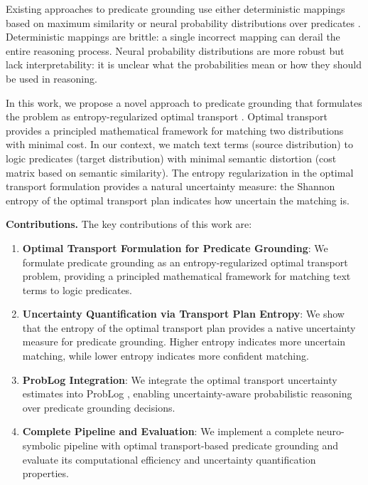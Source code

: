\documentclass[11pt,letterpaper]{article}
\begin{document}
Existing approaches to predicate grounding use either deterministic mappings based on maximum similarity \cite{Ryu2024} or neural probability distributions over predicates \cite{Yang2020}. Deterministic mappings are brittle: a single incorrect mapping can derail the entire reasoning process. Neural probability distributions are more robust but lack interpretability: it is unclear what the probabilities mean or how they should be used in reasoning.

In this work, we propose a novel approach to predicate grounding that formulates the problem as entropy-regularized optimal transport \cite{Cuturi2013, Peyre2019}. Optimal transport provides a principled mathematical framework for matching two distributions with minimal cost. In our context, we match text terms (source distribution) to logic predicates (target distribution) with minimal semantic distortion (cost matrix based on semantic similarity). The entropy regularization in the optimal transport formulation provides a natural uncertainty measure: the Shannon entropy of the optimal transport plan indicates how uncertain the matching is.

\textbf{Contributions.} The key contributions of this work are:

\begin{enumerate}
\item \textbf{Optimal Transport Formulation for Predicate Grounding}: We formulate predicate grounding as an entropy-regularized optimal transport problem, providing a principled mathematical framework for matching text terms to logic predicates.

\item \textbf{Uncertainty Quantification via Transport Plan Entropy}: We show that the entropy of the optimal transport plan provides a native uncertainty measure for predicate grounding. Higher entropy indicates more uncertain matching, while lower entropy indicates more confident matching.

\item \textbf{ProbLog Integration}: We integrate the optimal transport uncertainty estimates into ProbLog \cite{Raedt2007}, enabling uncertainty-aware probabilistic reasoning over predicate grounding decisions.

\item \textbf{Complete Pipeline and Evaluation}: We implement a complete neuro-symbolic pipeline with optimal transport-based predicate grounding and evaluate its computational efficiency and uncertainty quantification properties.
\end{enumerate}
\end{document}
